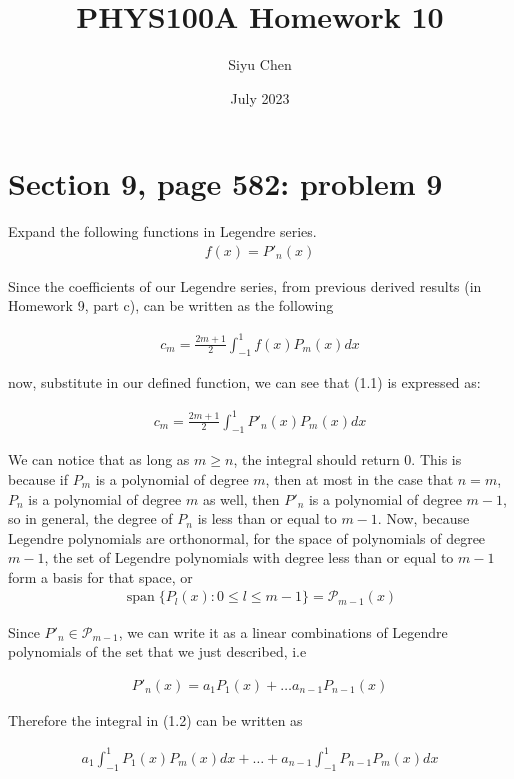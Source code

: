\documentclass{article}
\title{PHYS100A Homework 10}
\author{Siyu Chen}
\date{July 2023}
\numberwithin{equation}{section}
\newcommand{\Set}[1]{\{#1\}}
\DeclareMathOperator{\spn}{span}
\begin{document}
\maketitle

\section{Section 9, page 582: problem 9}
Expand the following functions in Legendre series.
\begin{align*}
    f(x) = P'_n(x)
\end{align*}

Since the coefficients of our Legendre series, from previous derived results (in Homework 9, part c), can be written as the following

\begin{align}
    c_m  = \frac{2m+1}{2} \int_{-1}^{1} f(x) P_m(x)dx
\end{align}

now, substitute in our defined function, we can see that (1.1) is expressed as:

\begin{align}
    c_m = \frac{2m+1}{2} \int_{-1}^{1} P'_n(x) P_m(x)dx
\end{align}

We can notice that as long as $m \geq n$, the integral should return $0$. This is because if $P_m$ is a polynomial of degree $m$, then at most in the case that $n = m$, $P_n$ is a polynomial of degree $m$ as well, then $P'_n$ is a polynomial of degree $m-1$, so in general, the degree of $P_n$ is less than or equal to $m-1$. Now, because Legendre polynomials are orthonormal, for the space of polynomials of degree $m-1$, the set of Legendre polynomials with degree less than or equal to $m-1$ form a basis for that space, or 
\begin{align}
    \spn \Set{ P_l(x) : 0 \leq l \leq m-1 } = \mathscr{P}_{m-1} (x)
\end{align}

Since $P'_n \in \mathscr{P}_{m-1}$, we can write it as a linear combinations of Legendre polynomials of the set that we just described, i.e

\begin{align}
    P'_n(x) = a_1 P_1(x) + \ldots a_{n-1} P_{n-1}(x)
\end{align}

Therefore the integral in (1.2) can be written as

\begin{align}
    a_1 \int_{-1}^{1} P_1(x) P_m(x)dx + \ldots + a_{n-1} \int_{-1}^{1} P_{n-1} P_m(x)dx
\end{align}
\end{document}
